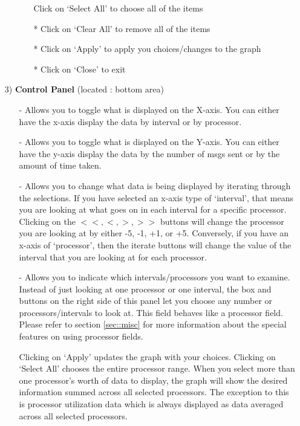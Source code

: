 \documentclass[10pt]{report}
\begin{document}
\begin{enumerate}
\begin{itemize}
\begin{itemize}
      Click on `Select All' to choose all of the items
      \item[*]
      Click on `Clear All' to remove all of the items
      \item[*]
      Click on `Apply' to apply you choices/changes to the graph
      \item[*]
      Click on `Close' to exit
      \end{itemize}
   \end{itemize}
\item[3)]
{\bf Control Panel} (located : bottom area)
   \begin{itemize}
   \item[-]
   Allows you to toggle what is displayed on the X-axis.  You can either
   have the x-axis display the data by interval or by processor.
   \item[-]
   Allows you to toggle what is displayed on the Y-axis.  You can
   either have the y-axis display the data by the number of msgs sent
   or by the amount of time taken.
   \item[-]
   Allows you to change what data is being displayed by iterating
   through the selections.  If you have selected an x-axis type of
   `interval', that means you are looking at what goes on in each
   interval for a specific processor.  Clicking on the $<<, <, >, >>$
   buttons will change the processor you are looking at by either -5,
   -1, +1, or +5.  Conversely, if you have an x-axis of `processor',
   then the iterate buttons will change the value of the interval that
   you are looking at for each processor.
   \item[-]
   Allows you to indicate which intervals/processors you want to
   examine.  Instead of just looking at one processor or one interval,
   the box and buttons on the right side of this panel let you choose
   any number or processors/intervals to look at. This field behaves
   like a processor field. Please refer to section \ref{sec::misc} 
   for more information about the special features on using processor
   fields.

   Clicking on `Apply' updates the graph with your choices. Clicking
   on `Select All' chooses the entire processor range.  When you
   select more than one processor's worth of data to display, the
   graph will show the desired information summed across all selected
   processors. The exception to this is processor utilization data
   which is always displayed as data averaged across all selected
   processors.
   \end{itemize}
\end{enumerate}
\end{document}
